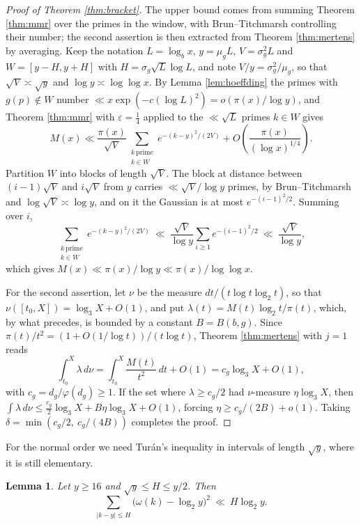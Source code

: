 \documentclass[11pt,reqno]{amsart}
\theoremstyle{plain}
\newtheorem{lemma}[theorem]{Lemma}
\theoremstyle{definition}
\begin{document}
\begin{proof}[Proof of Theorem \ref{thm:bracket}]
The upper bound comes from summing Theorem \ref{thm:mmr} over the primes in the window, with Brun--Titchmarsh controlling their number; the second assertion is then extracted from Theorem \ref{thm:mertens} by averaging. Keep the notation $L=\log_bx$, $y=\mu_gL$, $V=\sigma_g^{2}L$ and $W=[y-H,y+H]$ with $H=\sigma_g\sqrt L\log L$, and note $V/y=\sigma_g^{2}/\mu_g$, so that $\sqrt V\asymp\sqrt y$ and $\log y\asymp\log\log x$. By Lemma \ref{lem:hoeffding} the primes with $g(p)\notin W$ number $\ll x\exp(-c(\log L)^{2})=o(\pi(x)/\log y)$, and Theorem \ref{thm:mmr} with $\varepsilon=\frac14$ applied to the $\ll\sqrt L$ primes $k\in W$ gives
\[
M(x)\ll\frac{\pi(x)}{\sqrt{V}}\sum_{\substack{k\ \text{prime}\\ k\in W}}e^{-(k-y)^{2}/(2V)}+O\!\left(\frac{\pi(x)}{(\log x)^{1/4}}\right).
\]
Partition $W$ into blocks of length $\sqrt V$. The block at distance between $(i-1)\sqrt V$ and $i\sqrt V$ from $y$ carries $\ll\sqrt V/\log y$ primes, by Brun--Titchmarsh and $\log\sqrt V\asymp\log y$, and on it the Gaussian is at most $e^{-(i-1)^{2}/2}$. Summing over $i$,
\[
\sum_{\substack{k\ \text{prime}\\ k\in W}}e^{-(k-y)^{2}/(2V)}\ \ll\ \frac{\sqrt V}{\log y}\sum_{i\ge1}e^{-(i-1)^{2}/2}\ \ll\ \frac{\sqrt V}{\log y},
\]
which gives $M(x)\ll\pi(x)/\log y\ll\pi(x)/\log\log x$.

For the second assertion, let $\nu$ be the measure $dt/(t\log t\log_2t)$, so that $\nu([t_0,X])=\log_3X+O(1)$, and put $\lambda(t)=M(t)\log_2t/\pi(t)$, which, by what precedes, is bounded by a constant $B=B(b,g)$. Since $\pi(t)/t^{2}=(1+O(1/\log t))/(t\log t)$, Theorem \ref{thm:mertens} with $j=1$ reads
\[
\int_{t_0}^{X}\lambda\,d\nu=\int_{t_0}^{X}\frac{M(t)}{t^{2}}\,dt+O(1)=c_g\log_3X+O(1),
\]
with $c_g=d_g/\varphi(d_g)\ge1$. If the set where $\lambda\ge c_g/2$ had $\nu$-measure $\eta\log_3X$, then $\int\lambda\,d\nu\le\frac{c_g}{2}\log_3X+B\eta\log_3X+O(1)$, forcing $\eta\ge c_g/(2B)+o(1)$. Taking $\delta=\min(c_g/2,\ c_g/(4B))$ completes the proof.
\end{proof}

For the normal order we need Tur\'an's inequality in intervals of length $\sqrt y$, where it is still elementary.

\begin{lemma}\label{lem:turan}
Let $y\ge16$ and $\sqrt y\le H\le y/2$. Then
\[
\sum_{|k-y|\le H}\big(\omega(k)-\log_2 y\big)^{2}\ \ll\ H\log_2 y .
\]
\end{lemma}
\end{document}
